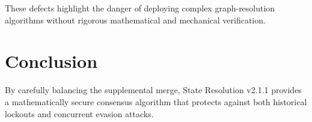 \documentclass[12pt]{article}
\begin{document}
These defects highlight the danger of deploying complex graph-resolution algorithms without rigorous mathematical and mechanical verification.

\section{Conclusion}
By carefully balancing the supplemental merge, State Resolution v2.1.1 provides a mathematically secure consensus algorithm that protects against both historical lockouts and concurrent evasion attacks.
\end{document}
